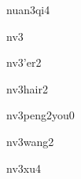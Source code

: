\begin{multicols}{2}
\begin{verbete}[暖气]{nuan3qi4}
\end{verbete}

\begin{verbete}[女]{nv3}
\end{verbete}

\begin{verbete}[女儿]{nv3'er2}
\end{verbete}

\begin{verbete}[女孩儿]{nv3hair2}
\end{verbete}

\begin{verbete}[女朋友]{nv3peng2you0}
\end{verbete}

\begin{verbete}[女王]{nv3wang2}
\end{verbete}

\begin{verbete}[女婿]{nv3xu4}
\end{verbete}

\end{multicols}
